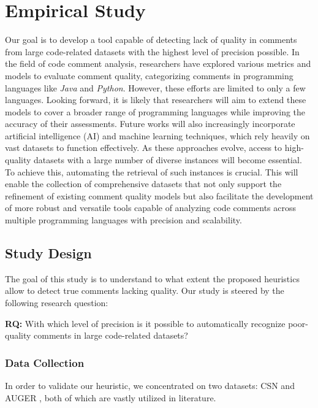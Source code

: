 
\chapter{Empirical Study} %

\label{Chapter4}


Our goal is to develop a tool capable of detecting lack of quality in comments from large code-related datasets with the highest level of precision possible. In the field of code comment analysis, researchers have explored various metrics and models to evaluate comment quality, categorizing comments in programming languages like \textit{Java} and \textit{Python}. However, these efforts are limited to only a few languages.
Looking forward, it is likely that researchers will aim to extend these models to cover a broader range of programming languages while improving the accuracy of their assessments. Future works will also increasingly incorporate artificial intelligence (AI) and machine learning techniques, which rely heavily on vast datasets to function effectively. As these approaches evolve, access to high-quality datasets with a large number of diverse instances will become essential.
To achieve this, automating the retrieval of such instances is crucial. This will enable the collection of comprehensive datasets that not only support the refinement of existing comment quality models but also facilitate the development of more robust and versatile tools capable of analyzing code comments across multiple programming languages with precision and scalability.

\section{Study Design}
The goal of this study is to understand to what extent the proposed heuristics allow to detect true comments lacking quality. Our study is steered by the following research
question:
\begin{large}
	\begin{Center}
		\textbf{RQ:} With which level of precision is it possible to automatically recognize poor-quality comments in large code-related datasets?
	\end{Center}
\end{large}

\subsection{Data Collection}
In order to validate our heuristic, we concentrated on two datasets: CSN \cite{CSN} and AUGER \cite{AUGER}, both of which are vastly utilized in literature.

